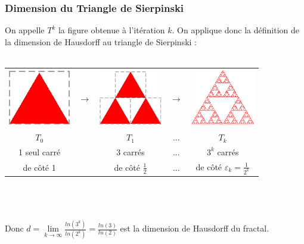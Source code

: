 \documentclass[a4paper,10pt]{report}
\begin{document}
\subsubsection{Dimension du Triangle de Sierpinski}
On appelle $T^k$ la figure obtenue à l'itération $k$. On applique donc la définition de la dimension de Hausdorff au triangle de Sierpinski :\\ \\
\begin{tabular}{ccccc}
\includegraphics[height=2.4cm]{sierpinski0.png} & $\rightarrow$ & \includegraphics[height=2.5cm]{sierpinski1.png} & $\rightarrow$ & \includegraphics[height=2.5cm]{sierpinskik.png}\\
$T_0$ & & $T_1$ & ... & $T_k$\\
1 seul carré & & 3 carrés & ... & $3^k$ carrés\\
de côté 1 & & de côté $\frac{1}{2}$ & ... & de côté $\varepsilon_k = \frac{1}{2^k}$\\
\end{tabular} \\ \\ \\
Donc $d=\lim\limits_{k \rightarrow \infty} \frac{ln(3^k)}{ln(2^k)}=\frac{ln(3)}{ln(2)}$ est la dimension de Hausdorff du fractal.

\newpage
\end{document}
